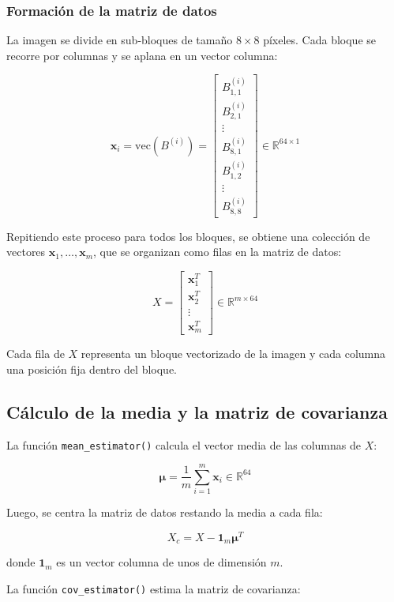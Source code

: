 \documentclass[a4paper,12pt]{article}
\numberwithin{equation}{section}
\numberwithin{figure}{section}
\begin{document}
\subsubsection*{Formación de la matriz de datos}

La imagen se divide en sub-bloques de tamaño \(8 \times 8\) píxeles. Cada bloque se recorre por columnas y se aplana en un vector columna:

\[
\mathbf{x}_i = \mathrm{vec}(B^{(i)}) =
\begin{bmatrix}
B^{(i)}_{1,1} \\
B^{(i)}_{2,1} \\
\vdots \\
B^{(i)}_{8,1} \\
B^{(i)}_{1,2} \\
\vdots \\
B^{(i)}_{8,8}
\end{bmatrix}
\in \mathbb{R}^{64 \times 1}
\]

Repitiendo este proceso para todos los bloques, se obtiene una colección de vectores \(\mathbf{x}_1, \ldots, \mathbf{x}_m\), que se organizan como filas en la matriz de datos:

\[
X =
\begin{bmatrix}
\mathbf{x}_1^T \\
\mathbf{x}_2^T \\
\vdots \\
\mathbf{x}_m^T
\end{bmatrix}
\in \mathbb{R}^{m \times 64}
\]

Cada fila de \(X\) representa un bloque vectorizado de la imagen y cada columna una posición fija dentro del bloque.

\subsection*{Cálculo de la media y la matriz de covarianza}

La función \texttt{mean\_estimator()} calcula el vector media de las columnas de \(X\):

\[
\boldsymbol{\mu} = \frac{1}{m} \sum_{i=1}^m \mathbf{x}_i \in \mathbb{R}^{64}
\]

Luego, se centra la matriz de datos restando la media a cada fila:

\[
X_c = X - \mathbf{1}_m \boldsymbol{\mu}^T
\]

donde \(\mathbf{1}_m\) es un vector columna de unos de dimensión \(m\).

La función \texttt{cov\_estimator()} estima la matriz de covarianza:
\end{document}
